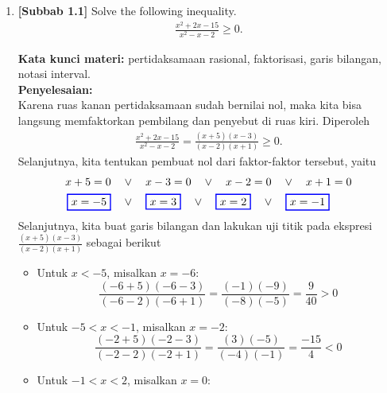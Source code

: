 \documentclass[10pt,openany,a4paper]{article}
\theoremstyle{definition}
\theoremstyle{definition}
\theoremstyle{plain}
\newenvironment{jawab}[2][tes]{%
\par\noindent\textbf{Kata kunci materi:} #1.\\
\textbf{Penyelesaian:} #2%
}{}
\begin{document}
\begin{enumerate}
    \item \textbf{[Subbab 1.1]} Solve the following inequality.
    \begin{align*}
        \frac{x^2+2x-15}{x^2-x-2}\geq 0.
    \end{align*}
    \begin{jawab}[pertidaksamaan rasional, faktorisasi, garis bilangan, notasi interval]{~\\
    Karena ruas kanan pertidaksamaan sudah bernilai nol, maka kita bisa langsung memfaktorkan pembilang dan penyebut di ruas kiri. Diperoleh
    \begin{align*}
        \frac{x^2+2x-15}{x^2-x-2} = \frac{(x+5)(x-3)}{(x-2)(x+1)} \geq 0.
    \end{align*}
    Selanjutnya, kita tentukan pembuat nol dari faktor-faktor tersebut, yaitu
    \begin{align*}
        x+5 = 0 \quad &\vee\quad x-3 = 0 \quad \vee\quad x-2 = 0 \quad \vee\quad x+1 = 0\\
        \colorlet{oldcolor}{.}
        \color{blue}
        \setlength{\fboxrule}{1pt} \boxed{\color{oldcolor}x=-5}\color{oldcolor} \quad &\vee\quad \colorlet{oldcolor}{.}
        \color{blue}
        \setlength{\fboxrule}{1pt} \boxed{\color{oldcolor}x=3}\color{oldcolor} \quad \vee\quad \colorlet{oldcolor}{.}
        \color{blue}
        \setlength{\fboxrule}{1pt} \boxed{\color{oldcolor}x=2}\color{oldcolor} \quad \vee\quad \colorlet{oldcolor}{.}
        \color{blue}
        \setlength{\fboxrule}{1pt} \boxed{\color{oldcolor}x=-1}\color{oldcolor}
    \end{align*}
    Selanjutnya, kita buat garis bilangan dan lakukan uji titik pada ekspresi \(\frac{(x+5)(x-3)}{(x-2)(x+1)}\) sebagai berikut
    \begin{itemize}
        \item Untuk \(x < -5\), misalkan \(x = -6\):
        \[
        \frac{(-6+5)(-6-3)}{(-6-2)(-6+1)} = \frac{(-1)(-9)}{(-8)(-5)} = \frac{9}{40} > 0
        \]
        \item Untuk \(-5 < x < -1\), misalkan \(x = -2\):
        \[
        \frac{(-2+5)(-2-3)}{(-2-2)(-2+1)} = \frac{(3)(-5)}{(-4)(-1)} = \frac{-15}{4} < 0
        \]
        \item Untuk \(-1 < x < 2\), misalkan \(x = 0\):

\end{itemize}}
\end{jawab}
\end{enumerate}
\end{document}
